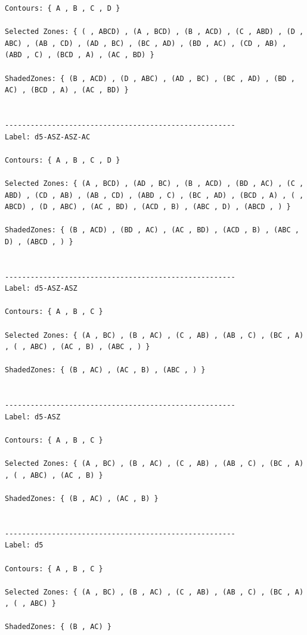 \documentclass[10pt, a4paper, titlepage]{article}
\begin{document}
\begin{lstlisting}
Contours: { A , B , C , D } 

Selected Zones: { ( , ABCD) , (A , BCD) , (B , ACD) , (C , ABD) , (D , ABC) , (AB , CD) , (AD , BC) , (BC , AD) , (BD , AC) , (CD , AB) , (ABD , C) , (BCD , A) , (AC , BD) }  

ShadedZones: { (B , ACD) , (D , ABC) , (AD , BC) , (BC , AD) , (BD , AC) , (BCD , A) , (AC , BD) } 


------------------------------------------------------
Label: d5-ASZ-ASZ-AC

Contours: { A , B , C , D } 

Selected Zones: { (A , BCD) , (AD , BC) , (B , ACD) , (BD , AC) , (C , ABD) , (CD , AB) , (AB , CD) , (ABD , C) , (BC , AD) , (BCD , A) , ( , ABCD) , (D , ABC) , (AC , BD) , (ACD , B) , (ABC , D) , (ABCD , ) }  

ShadedZones: { (B , ACD) , (BD , AC) , (AC , BD) , (ACD , B) , (ABC , D) , (ABCD , ) } 


------------------------------------------------------
Label: d5-ASZ-ASZ

Contours: { A , B , C } 

Selected Zones: { (A , BC) , (B , AC) , (C , AB) , (AB , C) , (BC , A) , ( , ABC) , (AC , B) , (ABC , ) }  

ShadedZones: { (B , AC) , (AC , B) , (ABC , ) } 


------------------------------------------------------
Label: d5-ASZ

Contours: { A , B , C } 

Selected Zones: { (A , BC) , (B , AC) , (C , AB) , (AB , C) , (BC , A) , ( , ABC) , (AC , B) }  

ShadedZones: { (B , AC) , (AC , B) } 


------------------------------------------------------
Label: d5

Contours: { A , B , C } 

Selected Zones: { (A , BC) , (B , AC) , (C , AB) , (AB , C) , (BC , A) , ( , ABC) }  

ShadedZones: { (B , AC) } 
\end{lstlisting}
\large
\end{document}
